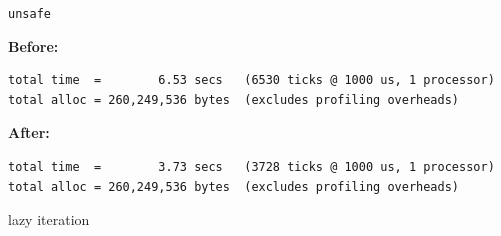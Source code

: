 \documentclass[ignorenonframetext,aspectratio=169]{beamer}
\newenvironment{Shaded}{}{}
\newcommand{\KeywordTok}[1]{\textcolor[rgb]{0.00,0.44,0.13}{\textbf{{#1}}}}
\newcommand{\DataTypeTok}[1]{\textcolor[rgb]{0.56,0.13,0.00}{{#1}}}
\newcommand{\DecValTok}[1]{\textcolor[rgb]{0.25,0.63,0.44}{{#1}}}
\newcommand{\OtherTok}[1]{\textcolor[rgb]{0.00,0.44,0.13}{{#1}}}
\newcommand{\FunctionTok}[1]{\textcolor[rgb]{0.02,0.16,0.49}{{#1}}}
\newcommand{\NormalTok}[1]{{#1}}
\begin{document}
\begin{frame}[fragile]{\texttt{unsafe}}

{\bf Before:}

\begin{verbatim}
total time  =        6.53 secs   (6530 ticks @ 1000 us, 1 processor)
total alloc = 260,249,536 bytes  (excludes profiling overheads)
\end{verbatim}

{\bf After:}

\begin{verbatim}
total time  =        3.73 secs   (3728 ticks @ 1000 us, 1 processor)
total alloc = 260,249,536 bytes  (excludes profiling overheads)
\end{verbatim}

\end{frame}

\begin{frame}[fragile]{lazy iteration}

\begin{Shaded}
\end{Shaded}

\end{frame}
\end{document}
